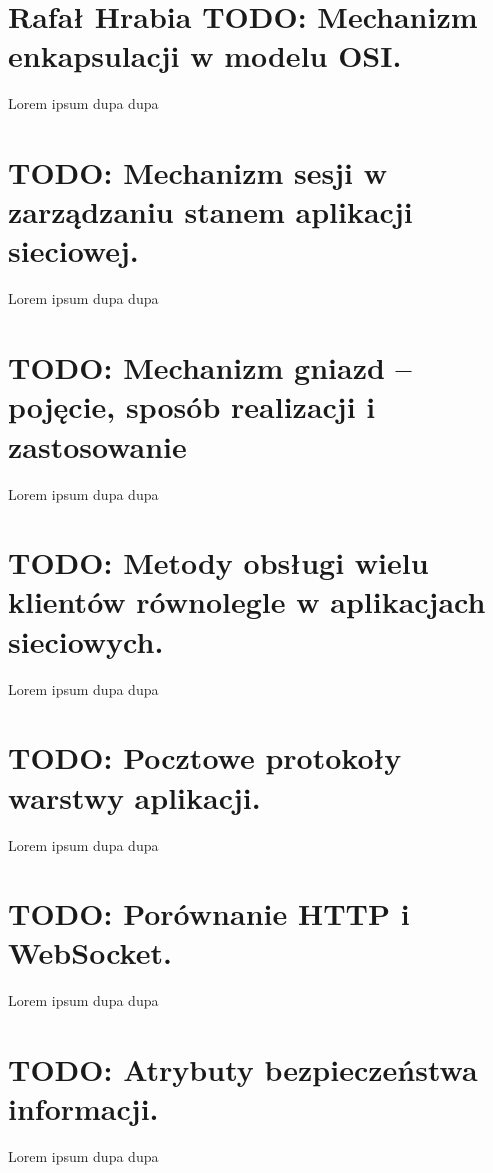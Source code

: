 \documentclass[a4paper,12pt,oneside]{book}
\begin{document}
		\setcounter{section}{12}
		\section{\color{green}Rafał Hrabia \color{red} TODO: Mechanizm enkapsulacji w modelu OSI. }
		
		Lorem ipsum dupa dupa
		
		\setcounter{section}{57}
		\section{\color{red} TODO: Mechanizm sesji w zarządzaniu stanem aplikacji sieciowej. }
		
		Lorem ipsum dupa dupa
		
		\setcounter{section}{58}
		\section{\color{red} TODO: Mechanizm gniazd – pojęcie, sposób realizacji i zastosowanie }
		
		Lorem ipsum dupa dupa
		
		\setcounter{section}{59}
		\section{\color{red} TODO: Metody obsługi wielu klientów równolegle w aplikacjach sieciowych.}
		
		Lorem ipsum dupa dupa
		
		\setcounter{section}{60}
		\section{\color{red} TODO: Pocztowe protokoły warstwy aplikacji. }
		
		Lorem ipsum dupa dupa
		
		\setcounter{section}{61}
		\section{\color{red} TODO: Porównanie HTTP i WebSocket. }
		
		Lorem ipsum dupa dupa
		
		\setcounter{section}{62}
		\section{\color{red} TODO: Atrybuty bezpieczeństwa informacji. }
		
		Lorem ipsum dupa dupa
		
\end{document}
